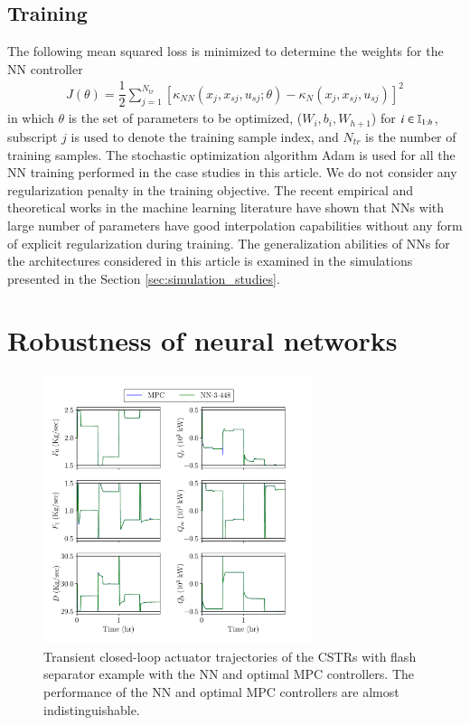\documentclass[preprint,5p, twocolumn, authoryear]{elsarticle}
\begin{document}
\subsection{Training}
The following mean squared loss is minimized to determine the weights for the NN
controller
\begin{align}
    J (\theta) = \dfrac{1}{2}\sum_{j=1}^{N_{tr}} 
[\kappa_{NN}(x_j, x_{sj}, u_{sj}; \theta) - \kappa_N(x_j, x_{sj}, u_{sj})]^2 
\end{align}
in which $\theta$ is the set of parameters to be optimized, ($W_i, b_i,
W_{h+1}$) for $i \in \mathbb{I}_{1:h}$, subscript $j$ is used to denote the training
sample index, and $N_{tr}$ is the number of training samples. The stochastic
optimization algorithm Adam \citep*{kingma:ba:2014} is used for all the NN
training performed in the case studies in this article. We do not consider any
regularization penalty in the training objective. The recent empirical and
theoretical works in the machine learning literature have shown that NNs with
large number of parameters have good interpolation capabilities
\citep*{belkin:hsu:ma:mandal:2019, zhang:bengio:hardt:recht:vinyals:2017,
arora:simon:hu:li:wang:2019, allen-zhu:li:liang:2019} without any form of
explicit regularization during training. The generalization abilities of NNs for
the architectures considered in this article is examined in the simulations
presented in the Section \ref{sec:simulation_studies}.

\section{Robustness of neural networks} \label{sec:robustness}

\begin{figure}[!h]
    \centering
	\includegraphics[page=1, width=0.7\textwidth,
		height=0.5\textheight]{cstrs_comparision_plots.pdf}    
        \caption{Transient closed-loop actuator trajectories of the CSTRs with
        flash separator example with the NN and optimal MPC controllers. The
        performance of the NN and optimal MPC controllers are almost
        indistinguishable.}   
    \label{fig:cl_cstrs_inputs}
\end{figure}
\end{document}
